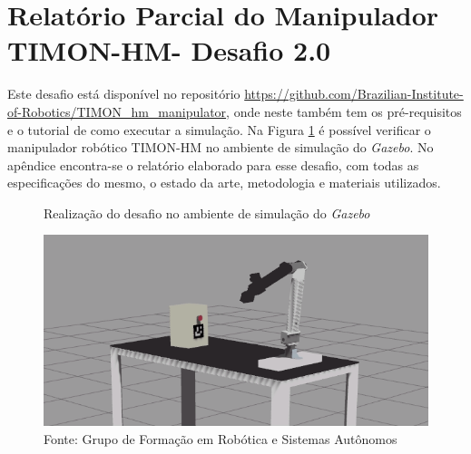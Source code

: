 




\section{Relatório Parcial do Manipulador TIMON-HM- Desafio 2.0 }
\label{sec:desafio_2}
Este desafio está disponível no repositório \url{https://github.com/Brazilian-Institute-of-Robotics/TIMON\_hm\_manipulator}, onde neste também tem os pré-requisitos e o tutorial de como executar a simulação. Na Figura \ref{fig:manipulador_simulacao} é possível verificar o manipulador robótico TIMON-HM no ambiente de simulação do \textit{Gazebo}. No apêndice encontra-se o relatório elaborado para esse desafio, com todas as especificações do mesmo, o estado da arte, metodologia e materiais utilizados.

\begin{figure}[H]
    \caption{Realização do desafio no ambiente de simulação do \textit{Gazebo}}
    \centering
    \includegraphics[width= \textwidth]{Figures/manipulador_simulacao.png}
    \caption*{Fonte: Grupo de Formação em Robótica e Sistemas Autônomos}
    \label{fig:manipulador_simulacao}
\end{figure}



